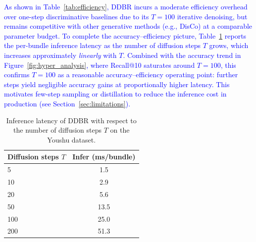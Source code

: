 \documentclass[lettersize,journal]{IEEEtran}
\newcommand{\revise}[1]{\textcolor{blue}{#1}}
\begin{document}
\begin{table}[htbp]
\caption{Efficiency comparison on the Youshu dataset. Inference latency is the average cost of scoring one test bundle; for DDBR it is measured at the production setting $T=100$.}
\label{tab:efficiency}
\centering
{}
\end{table}

\revise{As shown in Table~\ref{tab:efficiency}, DDBR incurs a moderate efficiency overhead over one-step discriminative baselines due to its $T=100$ iterative denoising, but remains competitive with other generative methods (e.g., DisCo) at a comparable parameter budget. To complete the accuracy--efficiency picture, Table~\ref{tab:latency_t} reports the per-bundle inference latency as the number of diffusion steps $T$ grows, which increases approximately \emph{linearly} with $T$. Combined with the accuracy trend in Figure~\ref{fig:hyper_analysis}, where Recall@10 saturates around $T=100$, this confirms $T=100$ as a reasonable accuracy--efficiency operating point: further steps yield negligible accuracy gains at proportionally higher latency. This motivates few-step sampling or distillation to reduce the inference cost in production (see Section~\ref{sec:limitations}).}

\begin{table}[htbp]
\caption{Inference latency of DDBR with respect to the number of diffusion steps $T$ on the Youshu dataset.}
\label{tab:latency_t}
\centering
\begin{tabular}{lc}
\toprule
\textbf{Diffusion steps $T$} & \textbf{Infer (ms/bundle)} \\
\midrule
5   & 1.5 \\
10  & 2.9 \\
20  & 5.6 \\
50  & 13.5 \\
100 & 25.0 \\
200 & 51.3 \\
\bottomrule
\end{tabular}
\end{table}
\end{document}

